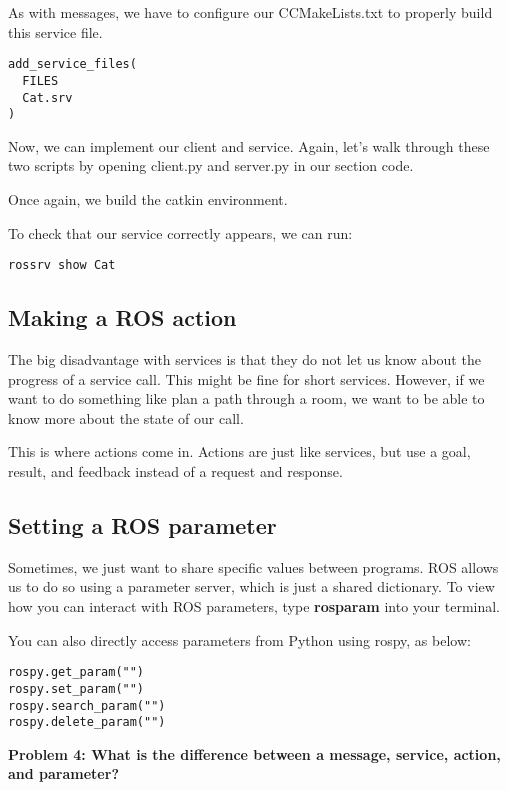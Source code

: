 As with messages, we have to configure our CCMakeLists.txt to properly build this service file. 

\begin{lstlisting}
add_service_files(
  FILES
  Cat.srv
)
\end{lstlisting}



Now, we can implement our client and service. Again, let's walk through these two scripts by opening client.py and server.py in our section code.

Once again, we build the catkin environment.

To check that our service correctly appears, we can run:

\begin{lstlisting}
rossrv show Cat
\end{lstlisting}	

\subsection{Making a ROS action}
The big disadvantage with services is that they do not let us know about the progress of a service call. This might be fine for short services. However, if we want to do something like plan a path through a room, we want to be able to know more about the state of our call. 

This is where actions come in. Actions are just like services, but use a goal, result, and feedback instead of a request and response. 

\subsection{Setting a ROS parameter}
Sometimes, we just want to share specific values between programs. ROS allows us to do so using a parameter server, which is just a shared dictionary. To view how you can interact with ROS parameters, type \textbf{rosparam} into your terminal.

You can also directly access parameters from Python using rospy, as below:

\begin{lstlisting}
rospy.get_param("")
rospy.set_param("")
rospy.search_param("")
rospy.delete_param("")
\end{lstlisting}

 \textbf{Problem 4: What is the difference between a message, service, action, and parameter?}

